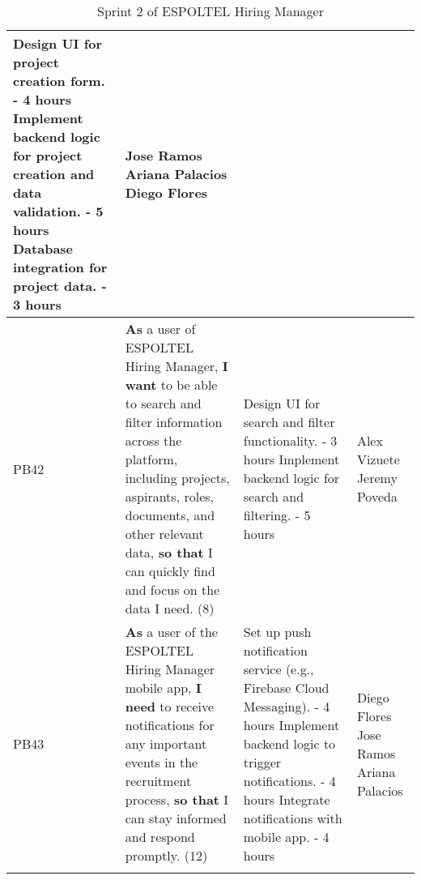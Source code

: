 \documentclass{scrreprt}
\begin{document}
\begin{longtable}{|p{1.5cm}|p{5.5cm}|p{4.5cm}|p{3cm}|}
	Design UI for project creation form. - 4 hours \newline
	Implement backend logic for project creation and data validation. - 5 hours \newline
	Database integration for project data. - 3 hours &
	Jose Ramos \newline
	Ariana Palacios \newline
	Diego Flores \\ \hline
	
	PB42 & \textbf{As} a user of ESPOLTEL Hiring Manager, \textbf{I want} to be able to search and filter information across the platform, including projects, aspirants, roles, documents, and other relevant data, \textbf{so that} I can quickly find and focus on the data I need. (8) &
	
	Design UI for search and filter functionality. - 3 hours \newline
	Implement backend logic for search and filtering. - 5 hours &
	Alex Vizuete \newline
	Jeremy Poveda \\ \hline
	
	PB43 & \textbf{As} a user of the ESPOLTEL Hiring Manager mobile app, \textbf{I need} to receive notifications for any important events in the recruitment process, \textbf{so that} I can stay informed and respond promptly. (12) &
	
	Set up push notification service (e.g., Firebase Cloud Messaging). - 4 hours \newline
	Implement backend logic to trigger notifications. - 4 hours \newline
	Integrate notifications with mobile app. - 4 hours &
	Diego Flores \newline
	Jose Ramos \newline
	Ariana Palacios \\ \hline
	
	\caption{Sprint 2 of ESPOLTEL Hiring Manager}
\end{longtable}
\end{document}
